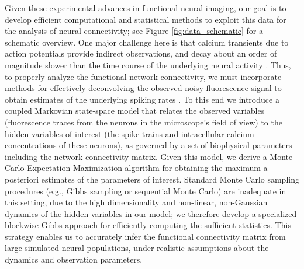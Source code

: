 \documentclass[aoas,preprint]{imsart}
\begin{document}
Given these experimental advances in functional neural imaging, our
goal is to develop efficient computational and statistical methods to
exploit this data for the analysis of neural connectivity; see Figure
\ref{fig:data_schematic} for a schematic overview.  One major
challenge here is that calcium transients due to action potentials
provide indirect observations, and decay about an order of magnitude
slower than the time course of the underlying neural activity
\cite{ImagingManual,Roxin08}. Thus, to properly analyze the functional
network connectivity, we must incorporate methods for effectively
deconvolving the observed noisy fluorescence signal to obtain
estimates of the underlying spiking rates
\cite{YaksiFriedrich06,GreenbergKerr08,Vogelstein2009}. To this end we
introduce a coupled Markovian state-space model that relates the
observed variables (fluorescence traces from the neurons in the
microscope's field of view) to the hidden variables of interest (the
spike trains and intracellular calcium concentrations of these
neurons), as governed by a set of biophysical parameters including the
network connectivity matrix. Given this model, we derive a Monte Carlo
Expectation Maximization algorithm for obtaining the maximum a
posteriori estimates of the parameters of interest. Standard Monte
Carlo sampling procedures (e.g., Gibbs sampling or sequential Monte
Carlo) are inadequate in this setting, due to the high dimensionality
and non-linear, non-Gaussian dynamics of the hidden variables in our
model; we therefore develop a specialized blockwise-Gibbs approach for
efficiently computing the sufficient statistics.  This strategy
enables us to accurately infer the functional connectivity matrix from
large simulated neural populations, under realistic assumptions about
the dynamics and observation parameters.
\end{document}
